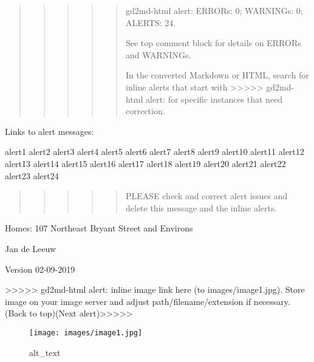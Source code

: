 \documentclass[
]{article}
\author{}
\date{\vspace{-2.5em}}
\begin{document}
\begin{quote}
\begin{quote}
\begin{quote}
\begin{quote}
\begin{quote}
gd2md-html alert: ERRORs: 0; WARNINGs: 0; ALERTS: 24.

See top comment block for details on ERRORs and WARNINGs.

In the converted Markdown or HTML, search for inline alerts that start
with \textgreater\textgreater\textgreater\textgreater\textgreater{}
gd2md-html alert: for specific instances that need correction.
\end{quote}
\end{quote}
\end{quote}
\end{quote}
\end{quote}

Links to alert messages:

alert1 alert2 alert3 alert4 alert5 alert6 alert7 alert8 alert9 alert10
alert11 alert12 alert13 alert14 alert15 alert16 alert17 alert18 alert19
alert20 alert21 alert22 alert23 alert24

\begin{quote}
\begin{quote}
\begin{quote}
\begin{quote}
\begin{quote}
PLEASE check and correct alert issues and delete this message and the
inline alerts.
\end{quote}
\end{quote}
\end{quote}
\end{quote}
\end{quote}

Homes: 107 Northeast Bryant Street and Environs

Jan de Leeuw

Version 02-09-2019

{\textgreater\textgreater\textgreater\textgreater\textgreater{}
gd2md-html alert: inline image link here (to images/image1.jpg). Store
image on your image server and adjust path/filename/extension if
necessary. }(Back to top)(Next
alert){\textgreater\textgreater\textgreater\textgreater\textgreater{} }

\begin{figure}
\centering
\texttt{[image: images/image1.jpg]}
\caption{alt\_text}
\end{figure}
\end{document}
